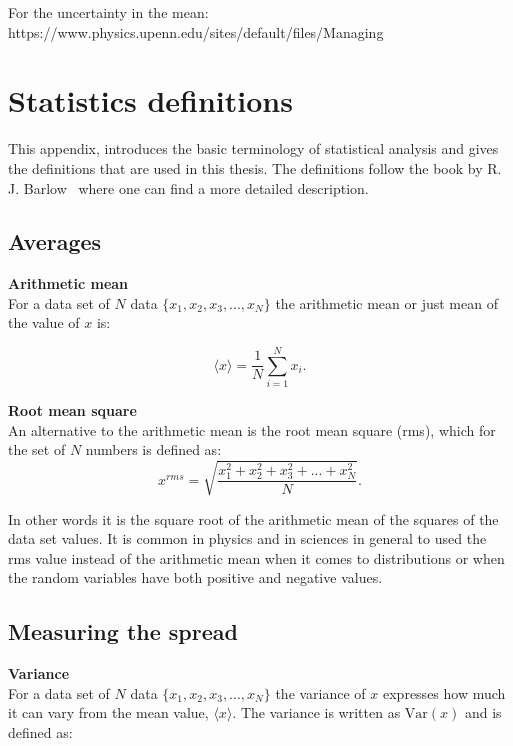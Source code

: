 For the uncertainty in the mean:
https://www.physics.upenn.edu/sites/default/files/Managing%

\section{Statistics definitions}\label{app:statistics_definitions}
This appendix, introduces the basic terminology of statistical analysis and gives the definitions that are used in this thesis. The definitions follow the book by R. J. Barlow~\cite{lvp.b313005720130101} where one can find a more detailed description.

\subsection{Averages}
\normalsize{\textbf{Arithmetic mean}}\\
For a data set of $N$ data $\{ x_1, x_2, x_3, ..., x_N \}$ the arithmetic mean or just mean of the value of $x$ is:

\begin{equation}\label{eq:mean_def}
    \langle x \rangle = \frac{1}{N} \sum_{i=1}^{N} x_i.
\end{equation}


\normalsize{\textbf{Root mean square}}\\
An alternative to the arithmetic mean is the root mean square (rms), which for the set of $N$ numbers is defined as:
\begin{equation}\label{eq:mean_def}
    x^{rms} = \sqrt{\frac{x_1^2+x_2^2+x_3^2+...+x_N^2}{N}}.
\end{equation}

In other words it is the square root of the arithmetic mean of the squares of the data set values. It is common in physics and in sciences in general to used the rms value instead of the arithmetic mean when it comes to distributions or when the random variables have both positive and negative values.

\subsection{Measuring the spread}
\normalsize{\textbf{Variance}}\\
For a data set of $N$ data $\{ x_1, x_2, x_3, ..., x_N \}$ the variance of $x$  expresses how much it can vary from the mean value, $\langle x \rangle$. The variance is written as $\mathrm{Var}(x)$ and is defined as:



